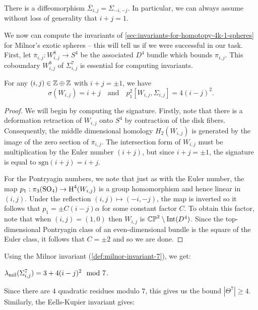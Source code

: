 \begin{proposition}
There is a diffeomorphism $\overline{\Sigma}_{i,j}=\Sigma_{-i,-j}$. In particular, we can always assume without loss of generality that $i+j=1$.
\end{proposition}

We now can compute the invariants of \cref{sec:invariants-for-homotopy-4k-1-spheres} for Milnor's exotic spheres -- this will tell us if we were successful in our task. First, let $\overline{\pi}_{i,j} : W_{i,j}^8 \to S^4$ be the associated $D^4$ bundle which bounds $\pi_{i,j}$. This coboundary $W_{i,j}^8$ of $\Sigma^7_{i,j}$ is essential for computing invariants.

\begin{proposition}
	For any $(i,j)\in \mathbb{Z}\oplus \mathbb{Z}$ with $i+j=\pm 1$, we have
	\[
		\sigma(W_{i,j}) = i+j\quad\textrm{and}\quad p_1^2[W_{i,j}, \Sigma_{i,j}]=4(i-j)^2.
	\]
\end{proposition}
\begin{proof}
	We will begin by computing the signature. Firstly, note that there is a deformation retraction of $W_{i,j}$ onto $S^4$ by contraction of the disk fibers. Consequently, the middle dimensional homology $H_2(W_{i,j})$ is generated by the image of the zero section of $\overline{\pi}_{i,j}$. The intersection form of $W_{i,j}$ must be multiplication by the Euler number $(i+j)$, but since $i+j=\pm 1$, the signature is equal to $\mathrm{sgn}(i+j)=i+j$.

	For the Pontryagin numbers, we note that just as with the Euler number, the map $p_1: \pi_3(\mathrm{SO}_4) \to \operatorname{H}^4(W_{i,j})$ is a group homomorphism and hence linear in $(i,j)$. Under the reflection $(i,j)\mapsto (-i,-j)$, the map is inverted so it follows that $p_1=\pm C(i-j)\alpha$ for some constant factor $C$. To obtain this factor, note that when $(i,j)=(1,0)$ then $W_{i,j}$ is $\mathbb{CP}^2\setminus \operatorname{Int}(D^4)$. Since the top-dimensional Pontryagin class of an even-dimensional bundle is the square of the Euler class, it follows that $C=\pm 2$ and so we are done.
\end{proof}

Using the Milnor invariant (\cref{def:milnor-invariant-7}), we get:
\begin{corollary}
	$\lambda_{\mathrm{mil}}(\Sigma^7_{i,j})=3+4(i-j)^2\mod 7$.
\end{corollary}

Since there are $4$ quadratic residues modulo $7$, this gives us the bound $|\Theta^7|\geq 4$. Similarly, the Eells-Kupier invariant gives:

